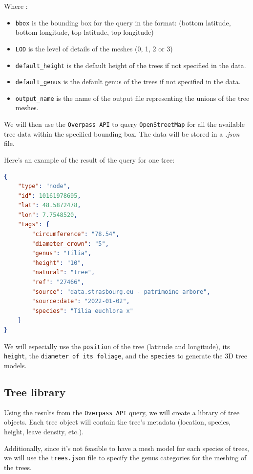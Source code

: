 \documentclass[12pt]{article}
\begin{document}
Where :
\begin{itemize}
    \item \texttt{bbox} is the bounding box for the query in the format:
    \subitem (bottom latitude, bottom longitude, top latitude, top longitude)

    \item \texttt{LOD} is the level of details of the meshes (0, 1, 2 or 3)
    \item \texttt{default\_height} is the default height of the trees if not specified in the data.
    \item \texttt{default\_genus} is the default genus of the trees if not specified in the data.
    \item \texttt{output\_name} is the name of the output file representing the unions of the tree meshes.
\end{itemize}


We will then use the \texttt{Overpass API} to query \texttt{OpenStreetMap}
for all the available tree data within the specified bounding box.
The data will be stored in a \textit{.json} file.

\newpage
Here's an example of the result of the query for one tree:

\begin{lstlisting}[language=json]
{
    "type": "node",
    "id": 10161978695,
    "lat": 48.5872478,
    "lon": 7.7548520,
    "tags": {
        "circumference": "78.54",
        "diameter_crown": "5",
        "genus": "Tilia",
        "height": "10",
        "natural": "tree",
        "ref": "27466",
        "source": "data.strasbourg.eu - patrimoine_arbore",
        "source:date": "2022-01-02",
        "species": "Tilia euchlora x"
    }
}
\end{lstlisting}

We will especially use the \texttt{position} of the tree (latitude and longitude),
its \texttt{height}, the \texttt{diameter of its foliage}, and the \texttt{species}
to generate the 3D tree models.

\subsection{Tree library}
Using the results from the \texttt{Overpass API} query, we will create a library
of tree objects. Each tree object will contain the tree's metadata (location, species, height,
leave density, etc.).

Additionally, since it's not feasible to have a mesh model for each species of trees, 
we will use the \texttt{trees.json} file to specify the genus 
categories for the meshing of the trees. \\
\end{document}
